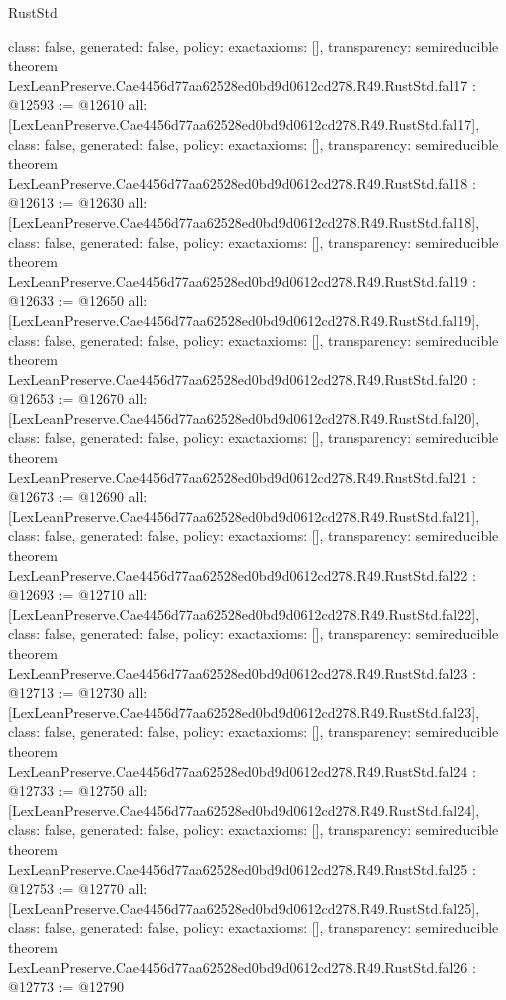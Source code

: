 \begin{lexlean}{RustStd}
\begin{coremodule}
{  class: false,
  generated: false,
  policy: exact{axioms: []},
  transparency: semireducible
}
theorem LexLeanPreserve.Cae4456d77aa62528ed0bd9d0612cd278.R49.RustStd.fal17 : @12593 := @12610 {
  all: [LexLeanPreserve.Cae4456d77aa62528ed0bd9d0612cd278.R49.RustStd.fal17],
  class: false,
  generated: false,
  policy: exact{axioms: []},
  transparency: semireducible
}
theorem LexLeanPreserve.Cae4456d77aa62528ed0bd9d0612cd278.R49.RustStd.fal18 : @12613 := @12630 {
  all: [LexLeanPreserve.Cae4456d77aa62528ed0bd9d0612cd278.R49.RustStd.fal18],
  class: false,
  generated: false,
  policy: exact{axioms: []},
  transparency: semireducible
}
theorem LexLeanPreserve.Cae4456d77aa62528ed0bd9d0612cd278.R49.RustStd.fal19 : @12633 := @12650 {
  all: [LexLeanPreserve.Cae4456d77aa62528ed0bd9d0612cd278.R49.RustStd.fal19],
  class: false,
  generated: false,
  policy: exact{axioms: []},
  transparency: semireducible
}
theorem LexLeanPreserve.Cae4456d77aa62528ed0bd9d0612cd278.R49.RustStd.fal20 : @12653 := @12670 {
  all: [LexLeanPreserve.Cae4456d77aa62528ed0bd9d0612cd278.R49.RustStd.fal20],
  class: false,
  generated: false,
  policy: exact{axioms: []},
  transparency: semireducible
}
theorem LexLeanPreserve.Cae4456d77aa62528ed0bd9d0612cd278.R49.RustStd.fal21 : @12673 := @12690 {
  all: [LexLeanPreserve.Cae4456d77aa62528ed0bd9d0612cd278.R49.RustStd.fal21],
  class: false,
  generated: false,
  policy: exact{axioms: []},
  transparency: semireducible
}
theorem LexLeanPreserve.Cae4456d77aa62528ed0bd9d0612cd278.R49.RustStd.fal22 : @12693 := @12710 {
  all: [LexLeanPreserve.Cae4456d77aa62528ed0bd9d0612cd278.R49.RustStd.fal22],
  class: false,
  generated: false,
  policy: exact{axioms: []},
  transparency: semireducible
}
theorem LexLeanPreserve.Cae4456d77aa62528ed0bd9d0612cd278.R49.RustStd.fal23 : @12713 := @12730 {
  all: [LexLeanPreserve.Cae4456d77aa62528ed0bd9d0612cd278.R49.RustStd.fal23],
  class: false,
  generated: false,
  policy: exact{axioms: []},
  transparency: semireducible
}
theorem LexLeanPreserve.Cae4456d77aa62528ed0bd9d0612cd278.R49.RustStd.fal24 : @12733 := @12750 {
  all: [LexLeanPreserve.Cae4456d77aa62528ed0bd9d0612cd278.R49.RustStd.fal24],
  class: false,
  generated: false,
  policy: exact{axioms: []},
  transparency: semireducible
}
theorem LexLeanPreserve.Cae4456d77aa62528ed0bd9d0612cd278.R49.RustStd.fal25 : @12753 := @12770 {
  all: [LexLeanPreserve.Cae4456d77aa62528ed0bd9d0612cd278.R49.RustStd.fal25],
  class: false,
  generated: false,
  policy: exact{axioms: []},
  transparency: semireducible
}
theorem LexLeanPreserve.Cae4456d77aa62528ed0bd9d0612cd278.R49.RustStd.fal26 : @12773 := @12790 {
}
\end{coremodule}
\end{lexlean}
